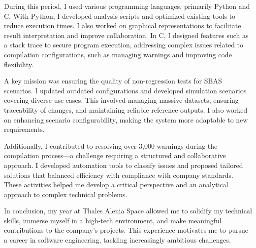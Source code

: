 During this period, I used various programming languages, primarily Python and C. With Python, I developed analysis scripts and optimized existing tools to reduce execution times. I also worked on graphical representations to facilitate result interpretation and improve collaboration. In C, I designed features such as a stack trace to secure program execution, addressing complex issues related to compilation configurations, such as managing warnings and improving code flexibility.

A key mission was ensuring the quality of non-regression tests for SBAS scenarios. I updated outdated configurations and developed simulation scenarios covering diverse use cases. This involved managing massive datasets, ensuring traceability of changes, and maintaining reliable reference outputs. I also worked on enhancing scenario configurability, making the system more adaptable to new requirements.

Additionally, I contributed to resolving over 3,000 warnings during the compilation process—a challenge requiring a structured and collaborative approach. I developed automation tools to classify issues and proposed tailored solutions that balanced efficiency with compliance with company standards. These activities helped me develop a critical perspective and an analytical approach to complex technical problems.

In conclusion, my year at Thales Alenia Space allowed me to solidify my technical skills, immerse myself in a high-tech environment, and make meaningful contributions to the company’s projects. This experience motivates me to pursue a career in software engineering, tackling increasingly ambitious challenges.